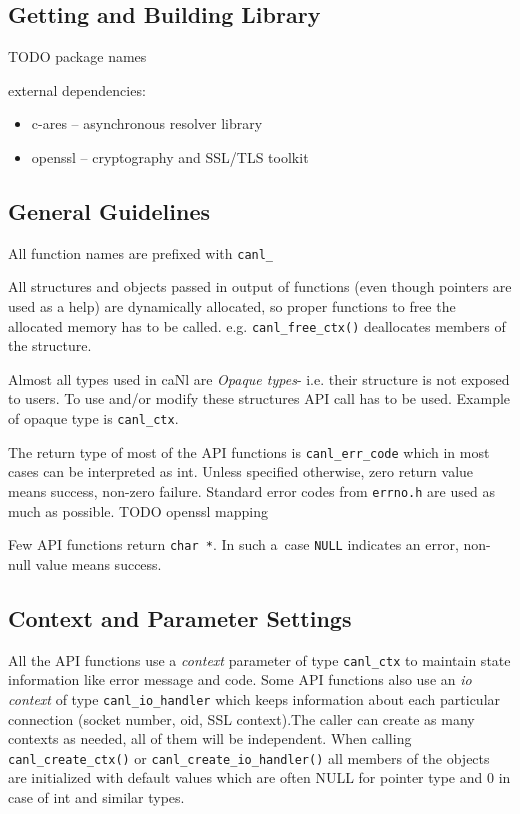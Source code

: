 \subsection{Getting and Building Library}
TODO package names

external dependencies:
\begin{itemize}
\item c-ares -- asynchronous resolver library
\item openssl -- cryptography and SSL/TLS toolkit
\end{itemize}

\subsection{General Guidelines}

%
All function names are prefixed with \verb'canl_'

%
All structures and objects passed in output of functions
(even though pointers are used as a help)
are dynamically allocated, so proper functions to free the allocated 
memory has to be called. e.g. \verb'canl_free_ctx()' 
deallocates members of the structure.

%
Almost all types used in caNl are \textit{Opaque types}- i.e. their structure is 
not exposed to users. To use and/or modify these structures API call has 
to be used. Example of opaque type is {\tt canl\_ctx}.

%
The return type of most of the API functions is {\tt canl\_err\_code} which
 in most cases can be interpreted as int. Unless specified otherwise, zero
return value means success, non-zero failure. Standard error codes from 
{\tt errno.h} are used as much as possible.
TODO openssl mapping

Few API functions return {\tt char *}. In such a~case
{\tt NULL} indicates an error, non-null value means success.

\subsection{Context and Parameter Settings}
\label{s:context}
All the API functions use a \emph{context} parameter of type {\tt canl\_ctx} 
to maintain state information like error message and code. 
Some API functions also use an \emph{io context} of type {\tt canl\_io\_handler}
which keeps information about each particular connection 
(\eg socket number, oid, SSL context).The caller can create as many 
contexts as needed, all of them will be independent. When calling
\verb'canl_create_ctx()' or \verb'canl_create_io_handler()' all members 
of the objects are initialized with default values which are often 
NULL for pointer type and 0 in case of int and similar types.

